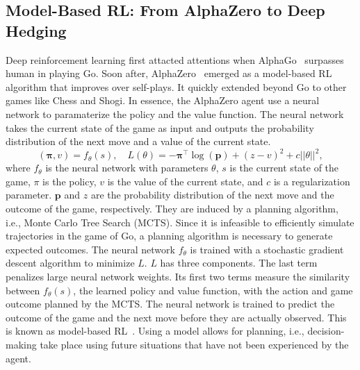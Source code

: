 \subsection{Model-Based RL: From AlphaZero to Deep Hedging}
Deep reinforcement learning first attacted attentions when AlphaGo~\citep{silver2016mastering} surpasses human in playing Go. 
Soon after, AlphaZero~\citep{silver2016mastering} emerged as a model-based RL algorithm that improves over self-plays.
It quickly extended beyond Go to other games like Chess and Shogi.
In essence, the AlphaZero agent use a neural network to paramaterize the policy and the value function.
The neural network takes the current state of the game as input and outputs the probability distribution of the next move and a value of the current state.
\begin{equation}
    (\mathbf{\pi}, v) = f_{\theta}(s), \quad L(\theta) = - \mathbf{\pi}^{\intercal} \log(\mathbf{p}) + (z - v)^2  + c||\theta||^2,
\end{equation}
where $f_{\theta}$ is the neural network with parameters $\theta$, $s$ is the current state of the game, $\pi$ is the policy, $v$ is the value of the current state, and $c$ is a regularization parameter.
$\mathbf{p}$ and $z$ are the probability distribution of the next move and the outcome of the game, respectively.
They are induced by a planning algorithm, i.e., Monte Carlo Tree Search (MCTS).
Since it is infeasible to efficiently simulate trajectories in the game of Go, a planning algorithm is necessary to generate expected outcomes.
The neural network $f_{\theta}$ is trained with a stochastic gradient descent algorithm to minimize $L$.
$L$ has three components.
The last term penalizes large neural network weights.
Its first two terms measure the similarity between $f_{\theta}(s)$, the learned policy and value function, with the action and game outcome planned by the MCTS.
The neural network is trained to predict the outcome of the game and the next move before they are actually observed.
This is known as model-based RL~\citep{sutton2018reinforcement}.
Using a model allows for planning, i.e., decision-making take place using future situations that have not been experienced by the agent.


